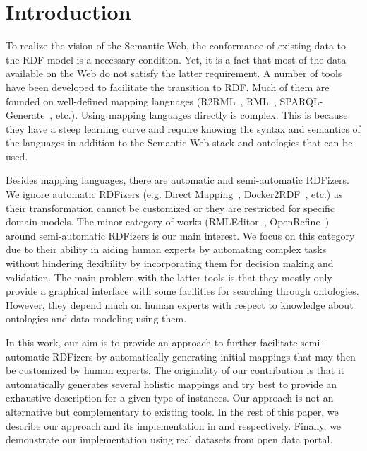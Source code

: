 \section{Introduction}

To realize the vision of the Semantic Web, the conformance of existing data to the RDF model is a necessary condition. Yet, it is a fact that most of the data available on the Web do not satisfy the latter requirement. A number of tools have been developed to facilitate the transition to RDF. Much of them are founded on well-defined mapping languages (R2RML~\cite{R2RML_W3C:12}, RML~\cite{dimou2014rml}, SPARQL-Generate~\cite{lefranccois2016flexible}, etc.). Using mapping languages directly is complex. This is because they have a steep learning curve and require knowing the syntax and semantics of the languages in addition to the Semantic Web stack and ontologies that can be used. 

Besides mapping languages, there are automatic and semi-automatic RDFizers. We ignore automatic RDFizers (e.g. Direct Mapping~\cite{Direct_Mapping_W3C:12}, Docker2RDF~\cite{ayed2017docker2rdf}, etc.) as their transformation cannot be customized or they are restricted for specific domain models. The minor category of works (RMLEditor~\cite{heyvaert2016rmleditor}, OpenRefine~\cite{verborgh2013using}) around semi-automatic RDFizers is our main interest. We focus on this category due to their ability in aiding human experts by automating complex tasks without hindering flexibility by incorporating them for decision making and validation. The main problem with the latter tools is that they mostly only provide a graphical interface with some facilities for searching through ontologies. However, they depend much on human experts with respect to knowledge about ontologies and data modeling using them.

In this work, our aim is to provide an approach to further facilitate semi-automatic RDFizers by automatically generating initial mappings that may then be customized by human experts. The originality of our contribution is that it automatically generates several holistic mappings and try best to provide an exhaustive description for a given type of instances. Our approach is not an alternative but complementary to existing tools. In the rest of this paper, we describe our approach and its implementation in  and  respectively. Finally, we demonstrate our implementation using real datasets from open data portal. %



